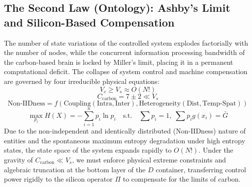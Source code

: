 \documentclass{article}
\begin{document}
\subsection*{The Second Law (Ontology): Ashby's Limit and Silicon-Based Compensation}
The number of state variations of the controlled system explodes factorially with the number of nodes, while the concurrent information processing bandwidth of the carbon-based brain is locked by Miller's limit, placing it in a permanent computational deficit. The collapse of system control and machine compensation are governed by four irreducible physical equations:
\begin{equation}
    V_c \ge V_s \approx O(N!)
\end{equation}
\begin{equation}
    C_{\text{carbon}} = 7 \pm 2 \ll V_s
\end{equation}
\begin{equation}
    \text{Non-IIDness} = f\left(\text{Coupling}(\text{Intra}, \text{Inter}), \text{Heterogeneity}(\text{Dist}, \text{Temp-Spat})\right)
\end{equation}
\begin{equation}
    \max_{p_i} H(X) = -\sum_{i=1}^{n} p_i \ln p_i \quad \text{s.t.} \quad \sum p_i = 1, \; \sum p_i g(x_i) = \bar{G}
\end{equation}
Due to the non-independent and identically distributed (Non-IIDness) nature of entities and the spontaneous maximum entropy degradation under high entropy states, the state space of the system expands rapidly to $O(N!)$. Under the gravity of $C_{\text{carbon}} \ll V_s$, we must enforce physical extreme constraints and algebraic truncation at the bottom layer of the $D$ container, transferring control power rigidly to the silicon operator $\Pi$ to compensate for the limits of carbon.
\end{document}
